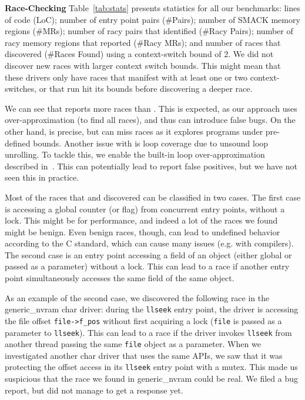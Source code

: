 \noindent
\textbf{Race-Checking}\xspace\xspace Table~\ref{tab:stats} presents statistics for all our benchmarks: lines of code (LoC); number of entry point pairs (\#Pairs); number of SMACK memory regions (\#MRs); number of racy pairs that \whoop identified (\#Racy Pairs); number of racy memory regions that \whoop reported (\#Racy MRs); and number of races that \corral discovered (\#Races Found) using a context-switch bound of 2. We did not discover new races with larger context switch bounds. This might mean that these drivers only have races that manifest with at least one or two context-switches, or that \corral run hit its bounds before discovering a deeper race.

We can see that \whoop reports more races than \corral. This is expected, as our approach uses over-approximation (to find all races), and thus can introduce false bugs. On the other hand, \corral is precise, but can miss races as it explores programs under pre-defined bounds. Another issue with \corral is loop coverage due to unsound loop unrolling. To tackle this, we enable the built-in loop over-approximation described in~\cite{lal2014powering}. This can potentially lead \corral to report false positives, but we have not seen this in practice.

Most of the races that \whoop and \corral discovered can be classified in two cases. The first case is accessing a global counter (or flag) from concurrent entry points, without a lock. This might be for performance, and indeed a lot of the races we found might be benign. Even benign races, though, can lead to undefined behavior according to the C standard, which can cause many issues (e.g. with compilers). The second case is an entry point accessing a field of an object (either global or passed as a parameter) without a lock. This can lead to a race if another entry point simultaneously accesses the same field of the same object.

As an example of the second case, we discovered the following race in the generic\_nvram char driver: during the \texttt{llseek} entry point, the driver is accessing the file offset \texttt{file->f\_pos} without first acquiring a lock (\texttt{file} is passed as a parameter to \texttt{llseek}). This can lead to a race if the driver invokes \texttt{llseek} from another thread passing the same \texttt{file} object as a parameter. When we investigated another char driver that uses the same APIs, we saw that it was protecting the offset access in its \texttt{llseek} entry point with a mutex. This made us suspicious that the race we found in generic\_nvram could be real. We filed a bug report, but did not manage to get a response yet.


